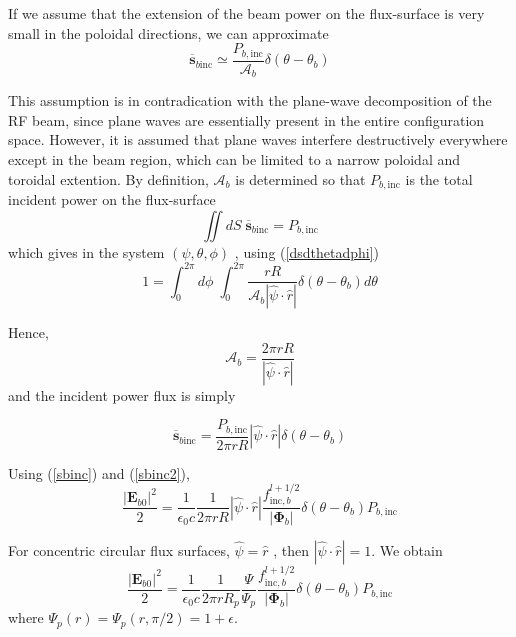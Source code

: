 If we assume that the extension of the beam power on the flux-surface is very
small in the poloidal directions, we can approximate
\begin{equation}
\overline{\mathbf{s}}_{b\text{inc}}\simeq\frac{P_{b,\text{inc}}}%
{\mathcal{A}_{b}}\delta\left(  \theta-\theta_{b}\right)
\end{equation}

This assumption is in contradication with the plane-wave decomposition of the
RF beam, since plane waves are essentially present in the entire configuration
space. However, it is assumed that plane waves interfere destructively
everywhere except in the beam region, which can be limited to a narrow
poloidal and toroidal extention. By definition, $\mathcal{A}_{b}$ is
determined so that $P_{b,\text{inc}}$ is the total incident power on the
flux-surface
\begin{equation}
\iint dS\;\overline{\mathbf{s}}_{b\text{inc}}=P_{b,\text{inc}}%
\end{equation}
which gives in the system $\left(  \psi,\theta,\phi\right)  $ , using
(\ref{dsdthetadphi})
\begin{equation}
1=\int_{0}^{2\pi}d\phi\;\int_{0}^{2\pi}\frac{rR}{\mathcal{A}_{b}\left|
\widehat{\psi}\cdot\widehat{r}\right|  }\delta\left(  \theta-\theta
_{b}\right)  d\theta
\end{equation}

Hence,
\begin{equation}
\mathcal{A}_{b}=\frac{2\pi rR}{\left|  \widehat{\psi}\cdot\widehat{r}\right|
}%
\end{equation}
and the incident power flux is simply%

\begin{equation}
\overline{\mathbf{s}}_{b\text{inc}}=\frac{P_{b,\text{inc}}}{2\pi rR}\left|
\widehat{\psi}\cdot\widehat{r}\right|  \delta\left(  \theta-\theta_{b}\right)
\label{sbinc2}%
\end{equation}

Using (\ref{sbinc}) and (\ref{sbinc2}),
\begin{equation}
\frac{\left|  \mathbf{E}_{b0}\right|  ^{2}}{2}=\frac{1}{\epsilon_{0}c}\frac
{1}{2\pi rR}\left|  \widehat{\psi}\cdot\widehat{r}\right|  \frac
{f_{\text{inc},b}^{l+1/2}}{\left|  \mathbf{\Phi}_{b}\right|  }\delta\left(
\theta-\theta_{b}\right)  P_{b,\text{inc}} \label{e0}%
\end{equation}

For concentric circular flux surfaces, $\widehat{\psi}=\widehat{r}$ , then
$\left|  \widehat{\psi}\cdot\widehat{r}\right|  =1$. We obtain
\begin{equation}
\frac{\left|  \mathbf{E}_{b0}\right|  ^{2}}{2}=\frac{1}{\epsilon_{0}c}\frac
{1}{2\pi rR_{p}}\frac{\Psi}{\Psi_{p}}\frac{f_{\text{inc},b}^{l+1/2}}{\left|
\mathbf{\Phi}_{b}\right|  }\delta\left(  \theta-\theta_{b}\right)  P_{b,\text{
inc}}%
\end{equation}
where $\Psi_{p}\left(  r\right)  =\Psi_{p}\left(  r,\pi/2\right)  =1+\epsilon$.


